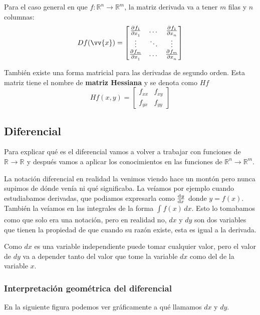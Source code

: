 \documentclass[12pt]{article}
\begin{document}
Para el caso general en que $ f:\mathbb{R}^{n} \to \mathbb{R}^{m} $, la matriz derivada va a tener $ m $ filas y $ n $ columnas:
\[
  Df(\vv{x})=\begin{bmatrix}
	  \pdv[]{f_{1}}{x_{1}} & \dots & \pdv[]{f_{1}}{x_{n}}\\
	  \vdots & \ddots & \vdots \\
	  \pdv[]{f_{m}}{x_{1}} & \dots & \pdv[]{f_{m}}{x_{n}}
  \end{bmatrix}
\]

También existe una forma matricial para las derivadas de segundo orden. Esta matriz tiene el nombre de \textbf{matriz Hessiana} y se denota como $ Hf $
\[
  Hf(x,y)=\begin{bmatrix}
	  f_{xx} & f_{xy} \\
	  f_{yx} & f_{yy}
  \end{bmatrix}
\]

\subsection{Diferencial}
Para explicar qué es el diferencial vamos a volver a trabajar con funciones de $ \mathbb{R}^{}\to\mathbb{R}^{} $ y después vamos a aplicar los conocimientos en las funciones de $ \mathbb{R}^{n}\to\mathbb{R}^{m} $.

La notación diferencial en realidad la venimos viendo hace un montón pero nunca supimos de dónde venía ni qué significaba. La veíamos por ejemplo cuando estudiabamos derivadas, que podiamos expresarla como $ \dv[]{y}{x} $ donde $ y = f(x) $. También la veíamos en las integrales de la forma $ \int_{}^{} f(x) \,dx $. Esto lo tomabamos como que solo era una notación, pero en realidad no, $ dx $ y $ dy $ son dos variables que tienen la propiedad de que cuando su razón existe, esta es igual a la derivada.

\vspace{0.2cm}

Como $ dx $ es una variable independiente puede tomar cualquier valor, pero el valor de $ dy $ va a depender tanto del valor que tome la variable $ dx $ como del de la variable $ x $.

\subsubsection{Interpretación geométrica del diferencial}
En la siguiente figura podemos ver gráficamente a qué llamamos $ dx $ y $ dy $.
\end{document}
